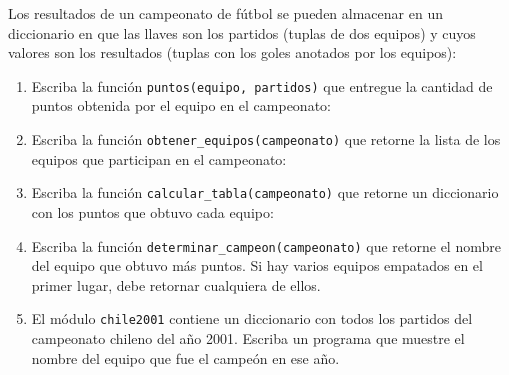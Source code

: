 Los resultados de un campeonato de fútbol
se pueden almacenar en un diccionario
en que las llaves son los partidos
(tuplas de dos equipos)
y cuyos valores son los resultados
(tuplas con los goles anotados por los equipos):



\begin{enumerate}[leftmargin=0pt,label=\emph{\alph*})]
  \item
    Escriba la función \texttt{puntos(equipo, partidos)}
    que entregue la cantidad de puntos obtenida por el equipo
    en el campeonato:
    

  \newpage
  \item
    Escriba la función \verb!obtener_equipos(campeonato)!
    que retorne la lista de los equipos que participan
    en el campeonato:

    

  \item
    Escriba la función \verb!calcular_tabla(campeonato)!
    que retorne un diccionario con los puntos
    que obtuvo cada equipo:

    

  \item
    Escriba la función \verb!determinar_campeon(campeonato)!
    que retorne el nombre del equipo que obtuvo más puntos.
    Si hay varios equipos empatados en el primer lugar,
    debe retornar cualquiera de ellos.

  \item
    El módulo \verb!chile2001! contiene un diccionario
    con todos los partidos del campeonato chileno del año 2001.
    Escriba un programa que muestre el nombre del equipo
    que fue el campeón en ese año.

\end{enumerate}
